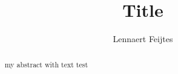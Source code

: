 \documentclass[twoside]{uva-inf-bachelor-thesis}
\title{Title}
\author{Lennaert Feijtes}
\begin{document}
\maketitle

\begin{abstract}
my abstract with text test
\end{abstract}

\tableofcontents






\end{document}
